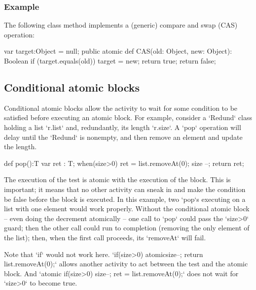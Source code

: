 {\subsubsection{Example}

The following class method implements a (generic) compare and swap (CAS) operation:


\begin{xten}
var target:Object = null;
public atomic def CAS(old: Object, new: Object): Boolean {
   if (target.equals(old)) {
     target = new;
     return true;
   }
   return false;
}
\end{xten}

\subsection{Conditional atomic blocks}

Conditional atomic blocks allow the activity to wait for some condition to be
satisfied before executing an atomic block. For example, consider a
\xcd`Redund` class holding a list \xcd`r.list` and, redundantly, its length
\xcd`r.size`.  A \xcd`pop` operation will delay until the \xcd`Redund` is
nonempty, and then remove an element and update the length.  
\begin{xten}
def pop():T {
  var ret : T;
  when(size>0) {
    ret = list.removeAt(0);
    size --;
    }
  return ret;
}
\end{xten}


The execution of the test is atomic with the execution of the block.  This is
important; it means that no other activity can sneak in and make the condition
be false before the block is executed.  In this example, two \xcd`pop`s
executing on a list with one element would work properly. Without the
conditional atomic block -- even doing the decrement atomically -- one call to
\xcd`pop` could pass the \xcd`size>0` guard; then the other call could run to
completion (removing the only element of the list); then, when the first call
proceeds, its \xcd`removeAt` will fail.  

Note that \xcd`if` would not work here.  
\xcd`if(size>0) atomic{size--; return list.removeAt(0);}` allows another
activity to act between the test and the atomic block.  
And 
\xcd`atomic{ if(size>0) {size--; ret = list.removeAt(0);}}` 
does not wait for \xcd`size>0` to become true.


}
